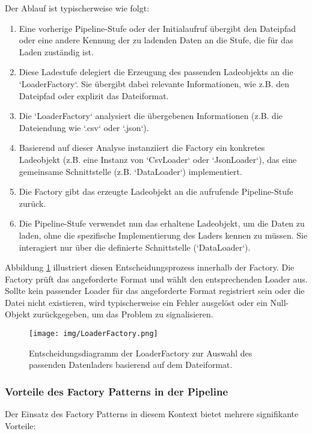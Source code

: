 \documentclass[11pt, a4paper]{article}
\begin{document}
Der Ablauf ist typischerweise wie folgt:
\begin{enumerate}
    \item Eine vorherige Pipeline-Stufe oder der Initialaufruf übergibt den Dateipfad oder eine andere Kennung der zu ladenden Daten an die Stufe, die für das Laden zuständig ist.
    \item Diese Ladestufe delegiert die Erzeugung des passenden Ladeobjekts an die `LoaderFactory`. Sie übergibt dabei relevante Informationen, wie z.B. den Dateipfad oder explizit das Dateiformat.
    \item Die `LoaderFactory` analysiert die übergebenen Informationen (z.B. die Dateiendung wie `.csv` oder `.json`).
    \item Basierend auf dieser Analyse instanziiert die Factory ein konkretes Ladeobjekt (z.B. eine Instanz von `CsvLoader` oder `JsonLoader`), das eine gemeinsame Schnittstelle (z.B. `DataLoader`) implementiert.
    \item Die Factory gibt das erzeugte Ladeobjekt an die aufrufende Pipeline-Stufe zurück.
    \item Die Pipeline-Stufe verwendet nun das erhaltene Ladeobjekt, um die Daten zu laden, ohne die spezifische Implementierung des Laders kennen zu müssen. Sie interagiert nur über die definierte Schnittstelle (`DataLoader`).
\end{enumerate}

Abbildung \ref{fig:loaderFactory} illustriert diesen Entscheidungsprozess innerhalb der Factory. Die Factory prüft das angeforderte Format und wählt den entsprechenden Loader aus. Sollte kein passender Loader für das angeforderte Format registriert sein oder die Datei nicht existieren, wird typischerweise ein Fehler ausgelöst oder ein Null-Objekt zurückgegeben, um das Problem zu signalisieren.

\begin{figure}[htbp] %
    \centering %
    \texttt{[image: img/LoaderFactory.png]} %
    \caption{Entscheidungsdiagramm der LoaderFactory zur Auswahl des passenden Datenladers basierend auf dem Dateiformat.} %
    \label{fig:loaderFactory} %
\end{figure}

\subsubsection{Vorteile des Factory Patterns in der Pipeline}
Der Einsatz des Factory Patterns in diesem Kontext bietet mehrere signifikante Vorteile:
\end{document}
